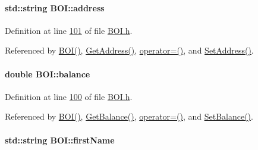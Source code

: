 \paragraph[{\texorpdfstring{address}{address}}]{\setlength{\rightskip}{0pt plus 5cm}std\+::string B\+O\+I\+::address\hspace{0.3cm}{\ttfamily [private]}}\hypertarget{class_b_o_i_ab9315fe76fd9f07551f5ae7899d33516_ab9315fe76fd9f07551f5ae7899d33516}{}\label{class_b_o_i_ab9315fe76fd9f07551f5ae7899d33516_ab9315fe76fd9f07551f5ae7899d33516}


Definition at line \hyperlink{_b_o_i_8h_source_l00101}{101} of file \hyperlink{_b_o_i_8h_source}{B\+O\+I.\+h}.



Referenced by \hyperlink{_b_o_i_8h_source_l00024}{B\+O\+I()}, \hyperlink{_b_o_i_8cpp_source_l00057}{Get\+Address()}, \hyperlink{_b_o_i_8h_source_l00065}{operator=()}, and \hyperlink{_b_o_i_8cpp_source_l00053}{Set\+Address()}.

\paragraph[{\texorpdfstring{balance}{balance}}]{\setlength{\rightskip}{0pt plus 5cm}double B\+O\+I\+::balance\hspace{0.3cm}{\ttfamily [private]}}\hypertarget{class_b_o_i_aa00a3d8baf3420647c40119b7fa4ed6f_aa00a3d8baf3420647c40119b7fa4ed6f}{}\label{class_b_o_i_aa00a3d8baf3420647c40119b7fa4ed6f_aa00a3d8baf3420647c40119b7fa4ed6f}


Definition at line \hyperlink{_b_o_i_8h_source_l00100}{100} of file \hyperlink{_b_o_i_8h_source}{B\+O\+I.\+h}.



Referenced by \hyperlink{_b_o_i_8h_source_l00024}{B\+O\+I()}, \hyperlink{_b_o_i_8cpp_source_l00065}{Get\+Balance()}, \hyperlink{_b_o_i_8h_source_l00065}{operator=()}, and \hyperlink{_b_o_i_8cpp_source_l00061}{Set\+Balance()}.

\paragraph[{\texorpdfstring{first\+Name}{firstName}}]{\setlength{\rightskip}{0pt plus 5cm}std\+::string B\+O\+I\+::first\+Name\hspace{0.3cm}{\ttfamily [private]}}\hypertarget{class_b_o_i_a12872fd8c15dbf833f78862b00579ed1_a12872fd8c15dbf833f78862b00579ed1}{}\label{class_b_o_i_a12872fd8c15dbf833f78862b00579ed1_a12872fd8c15dbf833f78862b00579ed1}


